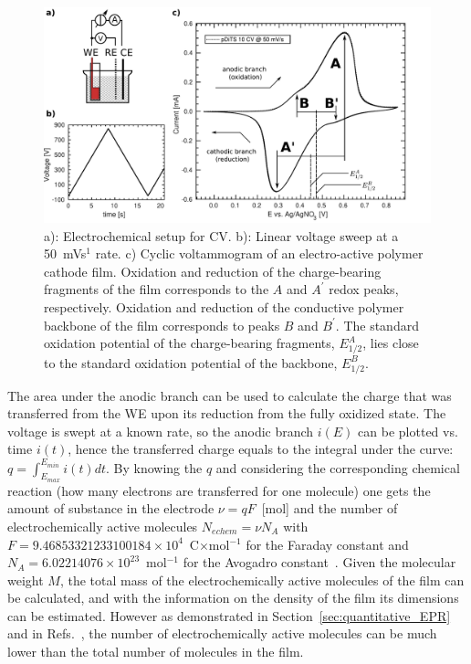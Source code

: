 \begin{figure}[h]
\center
	\includegraphics[width=1\textwidth]{./electrochemistry/figures/CV_pDiTBuS.pdf}
	\caption{a): Electrochemical setup for CV. b): Linear voltage sweep at a 50~mVs$^{1}$ rate. c) Cyclic voltammogram of an electro-active polymer cathode film. Oxidation and reduction of the charge-bearing fragments of the film corresponds to the $A$ and $A^\prime$ redox peaks, respectively. Oxidation and reduction of the conductive polymer backbone of the film corresponds to peaks $B$ and $B^\prime$. The standard oxidation potential of the charge-bearing fragments, $E_{1/2}^A$, lies close to the standard oxidation potential of the backbone, $E_{1/2}^B$.}
	\label{fig:CV_DiTBuS}
\end{figure}

The area under the anodic branch can be used to calculate the charge that was transferred from the WE upon its reduction from the fully oxidized state. The voltage is swept at a known rate, so the anodic branch $i(E)$ can be plotted vs. time $i(t)$, hence the transferred charge equals to the integral under the curve: $q = \int_{E_{max}}^{E_{min}}i(t)dt$. By knowing the $q$ and considering the corresponding chemical reaction (how many electrons are transferred for one molecule) one gets the amount of substance in the electrode $\nu=qF$~[mol] and the number of electrochemically active molecules $N_{echem}=\nu N_A$ with $F=9.46853321233100184\times10^4$~C$\times$mol$^{-1}$ for the Faraday constant and $N_A=6.02214076\times10^{23}$~mol$^{-1}$ for the Avogadro constant~\cite{NIST}. Given the molecular weight $M$, the total mass of the electrochemically active molecules of the film can be calculated, and with the information on the density of the film its dimensions can be estimated. However as demonstrated in Section~\ref{sec:quantitative_EPR} and in Refs.~\cite{Vereshchagin2022,Kulikov2022,Kulikov2023}, the number of electrochemically active molecules can be much lower than the total number of molecules in the film.  

